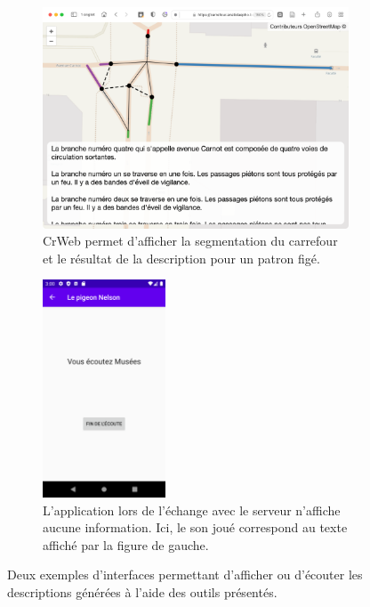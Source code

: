 \begin{figure}[ht]
    \centering
    \begin{subfigure}[t]{.49\linewidth}
        \centering
        \includegraphics[width=\textwidth]{images/experimentation/crweb.png}
        \caption{CrWeb permet d'afficher la segmentation du carrefour et le résultat de la description pour un patron figé.}
        \label{fig:experimentation_crweb}
    \end{subfigure}
    \hfill
    \begin{subfigure}[t]{.49\linewidth}
        \centering
        \includegraphics[width=0.4\textwidth]{images/experimentation/pigeonnelson.png}
        \caption{L'application lors de l'échange avec le serveur n'affiche aucune information. Ici, le son joué correspond au texte affiché par la figure de gauche.}
        \label{fig:experimentation_pigeonnelson}
    \end{subfigure}
    \caption[Interfaces simplifiées de génération de description]{Deux exemples d'interfaces permettant d'afficher ou d'écouter les descriptions générées à l'aide des outils présentés.}
    \label{fig:experimentation_crweb_pigeon}
\end{figure}

